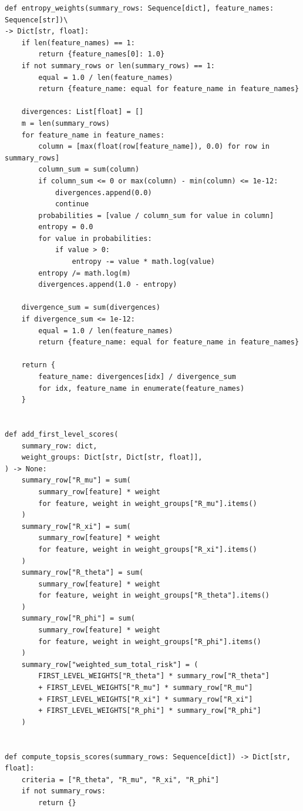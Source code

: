 \documentclass[a4paper, 12pt]{ctexart}
\begin{document}
\begin{verbatim}
def entropy_weights(summary_rows: Sequence[dict], feature_names: Sequence[str])\
-> Dict[str, float]:
    if len(feature_names) == 1:
        return {feature_names[0]: 1.0}
    if not summary_rows or len(summary_rows) == 1:
        equal = 1.0 / len(feature_names)
        return {feature_name: equal for feature_name in feature_names}

    divergences: List[float] = []
    m = len(summary_rows)
    for feature_name in feature_names:
        column = [max(float(row[feature_name]), 0.0) for row in summary_rows]
        column_sum = sum(column)
        if column_sum <= 0 or max(column) - min(column) <= 1e-12:
            divergences.append(0.0)
            continue
        probabilities = [value / column_sum for value in column]
        entropy = 0.0
        for value in probabilities:
            if value > 0:
                entropy -= value * math.log(value)
        entropy /= math.log(m)
        divergences.append(1.0 - entropy)

    divergence_sum = sum(divergences)
    if divergence_sum <= 1e-12:
        equal = 1.0 / len(feature_names)
        return {feature_name: equal for feature_name in feature_names}

    return {
        feature_name: divergences[idx] / divergence_sum
        for idx, feature_name in enumerate(feature_names)
    }


def add_first_level_scores(
    summary_row: dict,
    weight_groups: Dict[str, Dict[str, float]],
) -> None:
    summary_row["R_mu"] = sum(
        summary_row[feature] * weight
        for feature, weight in weight_groups["R_mu"].items()
    )
    summary_row["R_xi"] = sum(
        summary_row[feature] * weight
        for feature, weight in weight_groups["R_xi"].items()
    )
    summary_row["R_theta"] = sum(
        summary_row[feature] * weight
        for feature, weight in weight_groups["R_theta"].items()
    )
    summary_row["R_phi"] = sum(
        summary_row[feature] * weight
        for feature, weight in weight_groups["R_phi"].items()
    )
    summary_row["weighted_sum_total_risk"] = (
        FIRST_LEVEL_WEIGHTS["R_theta"] * summary_row["R_theta"]
        + FIRST_LEVEL_WEIGHTS["R_mu"] * summary_row["R_mu"]
        + FIRST_LEVEL_WEIGHTS["R_xi"] * summary_row["R_xi"]
        + FIRST_LEVEL_WEIGHTS["R_phi"] * summary_row["R_phi"]
    )


def compute_topsis_scores(summary_rows: Sequence[dict]) -> Dict[str, float]:
    criteria = ["R_theta", "R_mu", "R_xi", "R_phi"]
    if not summary_rows:
        return {}


\end{verbatim}
\end{document}
